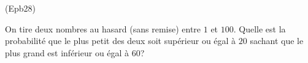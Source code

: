 \begin{tiny}(Epb28)\end{tiny} On tire deux nombres au hasard (sans remise) entre $1$ et $100$. Quelle est la probabilité que le plus petit des deux soit supérieur ou égal à $20$ sachant que le plus grand est inférieur ou égal à $60$? 